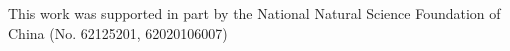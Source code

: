 \begin{acks}
This work was supported in part by the National Natural
Science Foundation of China (No. 62125201, 62020106007)
\end{acks}